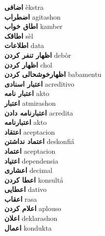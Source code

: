 \textbf{ اضافی  } èkstra \\
\textbf{ اضطراب  } agitashon \\
\textbf{ اطاق خواب  } kamber \\
\textbf{ اطاقک  } sèl \\
\textbf{ اطلاعات  } data \\
\textbf{ اظهار تنفر کردن  } debòr \\
\textbf{ اظهار کردن  } chol \\
\textbf{ اظهارخوشحالی کردن  } babamentu \\
\textbf{ اعتبار اسنادی  } acreditivo \\
\textbf{ اعتبار نامه  } akto \\
\textbf{ اعتبار  } atmirashon \\
\textbf{ اعتبارنامه دادن  } acredita \\
\textbf{ اعتبارنامه  } akto \\
\textbf{ اعتقاد  } aceptacion \\
\textbf{ اعتماد نداشتن  } deskonfiá \\
\textbf{ اعتماد  } aceptacion \\
\textbf{ اعتیاد  } dependensia \\
\textbf{ اعشاری  } decimal \\
\textbf{ اعطا کردن  } konsultá \\
\textbf{ اعطایی  } dativo \\
\textbf{ اعقاب  } rasa \\
\textbf{ اعلام کردن  } aplouso \\
\textbf{ اعلان  } deklarashon \\
\textbf{ اعمال  } kondukta \\
